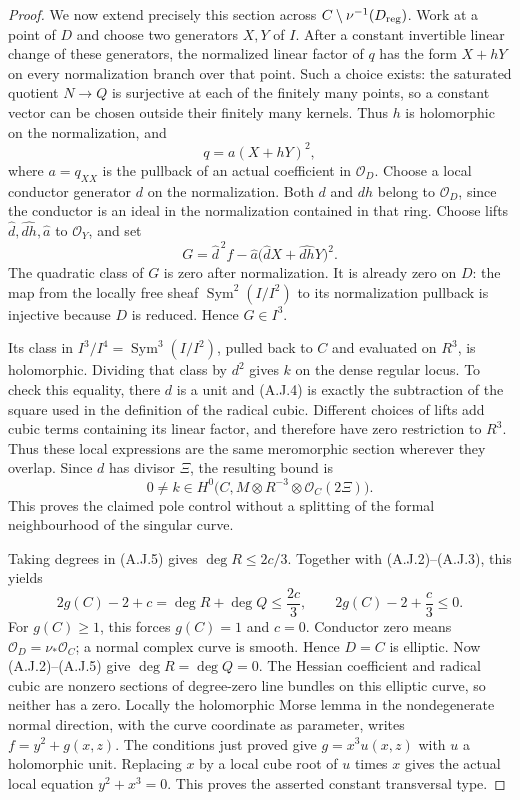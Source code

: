 \begin{proof}
We now extend precisely this section across $C\setminus
\nu^{-1}(D_{\rm reg})$. Work at a point of $D$ and choose
two generators $X,Y$ of $I$. After a constant invertible linear
change of these generators, the normalized linear factor of
$q$ has the form $X+hY$ on every normalization branch over
that point. Such a choice exists: the saturated quotient
$N\to Q$ is surjective at each of the finitely many points,
so a constant vector can be chosen outside their finitely
many kernels. Thus $h$ is holomorphic on the normalization,
and
\[
 q=a(X+hY)^2,
\]
where $a=q_{XX}$ is the pullback of an actual coefficient
in $\mathcal O_D$. Choose a local conductor generator $d$
on the normalization. Both $d$ and $dh$ belong to
$\mathcal O_D$, since the conductor is an ideal in the
normalization contained in that ring. Choose lifts
$\widehat d,\widehat{dh},\widehat a$ to $\mathcal O_Y$,
and set
\[
 G=\widehat d^{\,2} f-
    \widehat a\bigl(\widehat d X+\widehat{dh}Y\bigr)^2.
                                                        \tag{A.J.4}
\]
The quadratic class of $G$ is zero after normalization.
It is already zero on $D$: the map from the locally free
sheaf $\operatorname{Sym}^2(I/I^2)$ to its normalization
pullback is injective because $D$ is reduced. Hence
$G\in I^3$.

Its class in $I^3/I^4=\operatorname{Sym}^3(I/I^2)$,
pulled back to $C$ and evaluated on $R^3$, is holomorphic.
Dividing that class by $d^2$ gives $k$ on the dense regular
locus. To check this equality, there $d$ is a unit and
(A.J.4) is exactly the subtraction of the square used in the
definition of the radical cubic. Different choices of lifts
add cubic terms containing its linear factor, and therefore
have zero restriction to $R^3$. Thus these local expressions
are the same meromorphic section wherever they overlap.
Since $d$ has divisor $\Xi$, the resulting bound is
\[
 0\ne k\in H^0\bigl(C,M\otimes R^{-3}
                               \otimes\mathcal O_C(2\Xi)\bigr).
                                                        \tag{A.J.5}
\]
This proves the claimed pole control without a splitting of
the formal neighbourhood of the singular curve.

Taking degrees in (A.J.5) gives $\deg R\leq2c/3$.
Together with (A.J.2)--(A.J.3), this yields
\[
 2g(C)-2+c=\deg R+\deg Q\leq\frac{2c}{3},
 \qquad 2g(C)-2+\frac c3\leq0.                     \tag{A.J.6}
\]
For $g(C)\geq1$, this forces $g(C)=1$ and $c=0$.
Conductor zero means $\mathcal O_D=\nu_*\mathcal O_C$;
a normal complex curve is smooth. Hence $D=C$ is elliptic.
Now (A.J.2)--(A.J.5) give $\deg R=\deg Q=0$.
The Hessian coefficient and radical cubic are nonzero
sections of degree-zero line bundles on this elliptic curve,
so neither has a zero. Locally the holomorphic Morse lemma
in the nondegenerate normal direction, with the curve
coordinate as parameter, writes $f=y^2+g(x,z)$.
The conditions just proved give $g=x^3u(x,z)$ with $u$ a
holomorphic unit. Replacing $x$ by a local cube root of $u$
times $x$ gives the actual local equation $y^2+x^3=0$.
This proves the asserted constant transversal type.


\end{proof}
